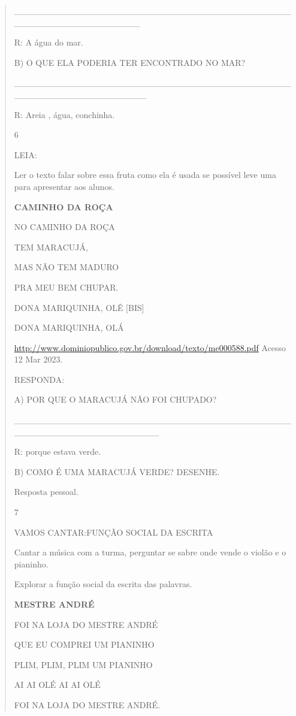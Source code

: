 {{{{\begin{verse}
{{\begin{escolha}
{{{{{\_\_\_\_\_\_\_\_\_\_\_\_\_\_\_\_\_\_\_\_\_\_\_\_\_\_\_\_\_\_\_\_\_\_\_\_\_\_\_\_\_\_\_\_\_\_\_\_\_\_\_\_\_\_\_\_\_\_\_\_\_\_\_\_

R: A água do mar.

B) O QUE ELA PODERIA TER ENCONTRADO NO MAR?

\_\_\_\_\_\_\_\_\_\_\_\_\_\_\_\_\_\_\_\_\_\_\_\_\_\_\_\_\_\_\_\_\_\_\_\_\_\_\_\_\_\_\_\_\_\_\_\_\_\_\_\_\_\_\_\_\_\_\_\_\_\_\_\_\_

R: Areia , água, conchinha.

\num{6}

LEIA:

Ler o texto falar sobre essa fruta como ela é usada se possível leve uma
para apresentar aos alunos.

\textbf{CAMINHO DA ROÇA}

NO CAMINHO DA ROÇA

TEM MARACUJÁ,

MAS NÃO TEM MADURO

PRA MEU BEM CHUPAR.

DONA MARIQUINHA, OLÊ {[}BIS{]}

DONA MARIQUINHA, OLÁ

\url{http://www.dominiopublico.gov.br/download/texto/me000588.pdf}
Acesso 12 Mar 2023.

RESPONDA:

A) POR QUE O MARACUJÁ NÃO FOI CHUPADO?

\_\_\_\_\_\_\_\_\_\_\_\_\_\_\_\_\_\_\_\_\_\_\_\_\_\_\_\_\_\_\_\_\_\_\_\_\_\_\_\_\_\_\_\_\_\_\_\_\_\_\_\_\_\_\_\_\_\_\_\_\_\_\_\_\_\_\_

R: porque estava verde.

B) COMO É UMA MARACUJÁ VERDE? DESENHE.

Resposta pessoal.

\num{7}

VAMOS CANTAR:FUNÇÃO SOCIAL DA ESCRITA

Cantar a música com a turma, perguntar se sabre onde vende o violão e o
pianinho.

Explorar a função social da escrita das palavras.

\textbf{MESTRE ANDRÉ}

FOI NA LOJA DO MESTRE ANDRÉ

QUE EU COMPREI UM PIANINHO

PLIM, PLIM, PLIM UM PIANINHO

AI AI OLÉ AI AI OLÉ

FOI NA LOJA DO MESTRE ANDRÉ.

}}}}}
\end{escolha}}}
\end{verse}}}}}

